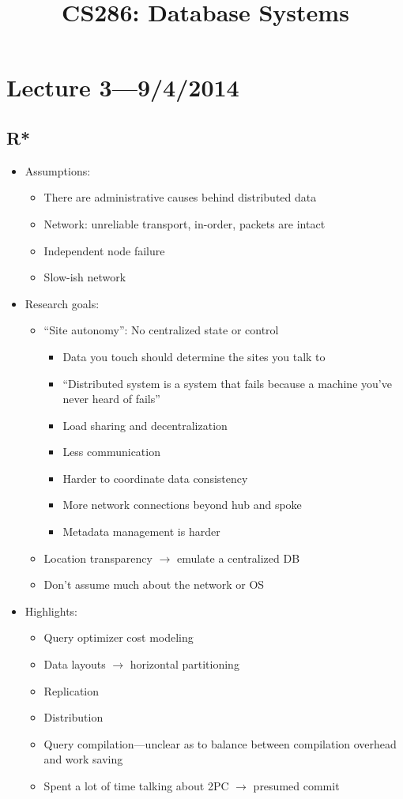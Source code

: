 \documentclass[10pt]{article}
\begin{document}
\date{}
\title{CS286: Database Systems}

\maketitle

\section{Lecture 3---9/4/2014}

\subsection{R*}

\begin{itemize}
\item Assumptions:
\begin{itemize}
\item There are administrative causes behind distributed data
\item Network: unreliable transport, in-order, packets are intact
\item Independent node failure
\item Slow-ish network
\end{itemize}
\item Research goals:
\begin{itemize}
\item ``Site autonomy'': No centralized state or control
\begin{itemize}
\item Data you touch should determine the sites you talk to
\item ``Distributed system is a system that fails because a machine you've never heard of fails''
\item Load sharing and decentralization
\item Less communication
\item Harder to coordinate data consistency
\item More network connections beyond hub and spoke
\item Metadata management is harder
\end{itemize}
\item Location transparency $\rightarrow$ emulate a centralized DB
\item Don't assume much about the network or OS
\end{itemize}
\item Highlights:
\begin{itemize}
\item Query optimizer cost modeling
\item Data layouts $\rightarrow$ horizontal partitioning
\item Replication
\item Distribution
\item Query compilation---unclear as to balance between compilation overhead and work saving
\item Spent a lot of time talking about 2PC $\rightarrow$ presumed commit
\end{itemize}
\end{itemize}
\end{document}
